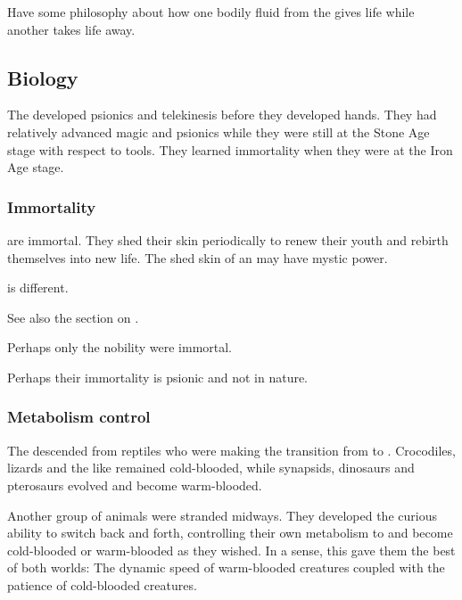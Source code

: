 Have some philosophy about how one bodily fluid from the \ophidians{} gives life while another takes life away. 









\subsection{Biology}
The \ophidians{} developed psionics and telekinesis before they developed hands. 
They had relatively advanced magic and psionics while they were still at the Stone Age stage with respect to tools. 
They learned immortality when they were at the Iron Age stage. 





\subsubsection{Immortality}
\Ophidians{} are immortal. They shed their skin periodically to renew their youth and rebirth themselves into new life. 
The shed skin of an \ophidian{} may have mystic power. 

 is different. 

See also the section on . 

Perhaps only the nobility were immortal. 

Perhaps their immortality is psionic and not  in nature. 





\subsubsection{Metabolism control}
The \ophidians{} descended from reptiles who were making the transition from  to . 
Crocodiles, lizards and the like remained cold-blooded, while synapsids, dinosaurs and pterosaurs evolved and become warm-blooded. 

Another group of animals were stranded midways. 
They developed the curious ability to switch back and forth, controlling their own metabolism to  and become cold-blooded or warm-blooded as they wished. 
In a sense, this gave them the best of both worlds: 
The dynamic speed of warm-blooded creatures coupled with the patience of cold-blooded creatures. 

